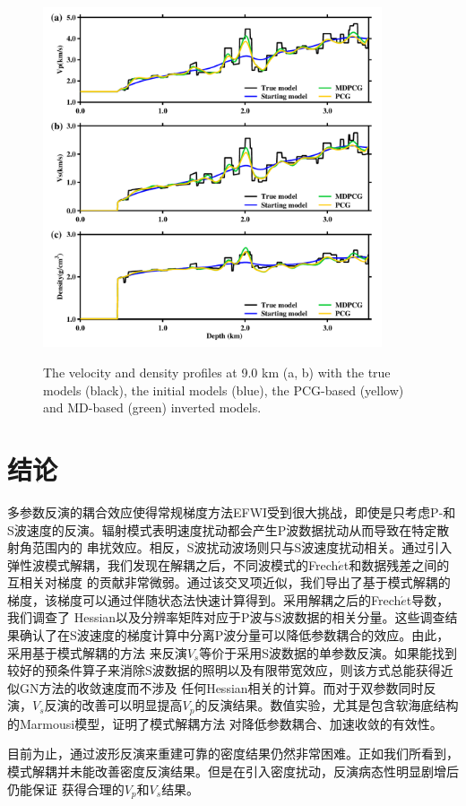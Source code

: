\begin{figure}
    \begin{center}
        {\includegraphics[width=10cm]{Figure/chapter02/tariqsugresult/Fig/9kmrho.pdf}}
        \caption{
        The velocity and density profiles at 9.0 km (a, b)  with the true models
            (black),
            the initial models (blue), the PCG-based (yellow) and MD-based (green)
            inverted models.
    }
    \label{fig:RhoProfile9km}
    \end{center}
\end{figure} 

\section{结论}
多参数反演的耦合效应使得常规梯度方法EFWI受到很大挑战，即使是只考虑P-和S波速度的反演。辐射模式表明速度扰动都会产生P波数据扰动从而导致在特定散射角范围内的
串扰效应。相反，S波扰动波场则只与S波速度扰动相关。通过引入弹性波模式解耦，我们发现在解耦之后，不同波模式的Frech{$\acute{e}$}t和数据残差之间的互相关对梯度
的贡献非常微弱。通过该交叉项近似，我们导出了基于模式解耦的梯度，该梯度可以通过伴随状态法快速计算得到。采用解耦之后的Frech{$\acute{e}$}t导数，我们调查了
Hessian以及分辨率矩阵对应于P波与S波数据的相关分量。这些调查结果确认了在S波速度的梯度计算中分离P波分量可以降低参数耦合的效应。由此，采用基于模式解耦的方法
来反演$V_s$等价于采用S波数据的单参数反演。如果能找到较好的预条件算子来消除S波数据的照明以及有限带宽效应，则该方式总能获得近似GN方法的收敛速度而不涉及
任何Hessian相关的计算。而对于双参数同时反演，$V_s$反演的改善可以明显提高$V_p$的反演结果。数值实验，尤其是包含软海底结构的Marmousi模型，证明了模式解耦方法
对降低参数耦合、加速收敛的有效性。

目前为止，通过波形反演来重建可靠的密度结果仍然非常困难。正如我们所看到，模式解耦并未能改善密度反演结果。但是在引入密度扰动，反演病态性明显剧增后仍能保证
获得合理的$V_p$和$V_s$结果。
